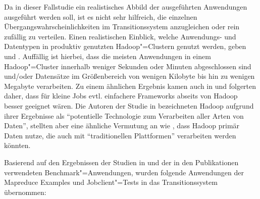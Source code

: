 Da in dieser Fallstudie ein realistisches Abbild der ausgeführten Anwendungen ausgeführt werden soll, ist es nicht sehr hilfreich, die einzelnen Übergangswahrscheinlichkeiten im Transitionssystem anzugleichen oder rein zufällig zu verteilen.
Einen realistischen Einblick, welche Anwendungs- und Datentypen in produktiv genutzten Hadoop"=Clustern genutzt werden, geben \uA \cite{Chen2012} und \cite{HadoopDataTypes}.
Auffällig ist hierbei, dass die meisten Anwendungen in einem Hadoop"=Cluster innerhalb weniger Sekunden oder Minuten abgeschlossen sind und/oder Datensätze im Größenbereich von wenigen Kilobyte bis hin zu wenigen Megabyte verarbeiten.
Zu einem ähnlichen Ergebnis kamen auch \citeauthor{Ren2013} in \cite{Ren2013} und folgerten daher, dass für kleine Jobs evtl. einfachere Frameworks abseits von Hadoop besser geeignet wären.
Die Autoren der Studie in \cite{HadoopDataTypes} bezeichneten Hadoop aufgrund ihrer Ergebnisse als \enquote{potentielle Technologie zum Verarbeiten aller Arten von Daten}, stellten aber eine ähnliche Vermutung an wie \citeauthor{Ren2013}, dass Hadoop primär Daten nutze, die auch mit \enquote{traditionellen Plattformen} verarbeiten werden könnten.

Basierend auf den Ergebnissen der Studien in \cite{Huang2010,Chen2012,HadoopDataTypes,Ren2013} und der in den Publikationen \cite{Shvachko2010,Dean2004,Graves2013} verwendeten Benchmark"=Anwendungen, wurden folgende Anwendungen der Mapreduce Examples und Jobclient"=Tests in das Transitionssystem übernommen:


